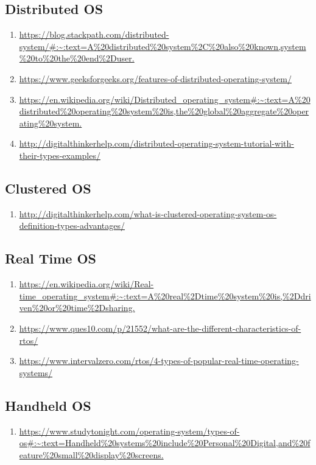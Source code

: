 \documentclass{article}
\begin{document}
\subsection{Distributed OS}
\begin{enumerate}
    \item \url{https://blog.stackpath.com/distributed-system/#:~:text=A%20distributed%20system%2C%20also%20known,system%20to%20the%20end%2Duser.}
    \item \url{https://www.geeksforgeeks.org/features-of-distributed-operating-system/}
    \item \url{https://en.wikipedia.org/wiki/Distributed_operating_system#:~:text=A%20distributed%20operating%20system%20is,the%20global%20aggregate%20operating%20system.}
    \item \url{http://digitalthinkerhelp.com/distributed-operating-system-tutorial-with-their-types-examples/}
\end{enumerate}
\subsection{Clustered OS}
\begin{enumerate}
    \item \url{ http://digitalthinkerhelp.com/what-is-clustered-operating-system-os-definition-types-advantages/}
\end{enumerate}
\subsection{Real Time OS}
\begin{enumerate}
    \item \url{https://en.wikipedia.org/wiki/Real-time_operating_system#:~:text=A%20real%2Dtime%20system%20is,%2Ddriven%20or%20time%2Dsharing.}
    \item \url{ https://www.ques10.com/p/21552/what-are-the-different-characteristics-of-rtos/}
    \item \url{ https://www.intervalzero.com/rtos/4-types-of-popular-real-time-operating-systems/}
\end{enumerate}
\subsection{Handheld OS}
\begin{enumerate}
    \item \url{https://www.studytonight.com/operating-system/types-of-os#:~:text=Handheld%20systems%20include%20Personal%20Digital,and%20feature%20small%20display%20screens.}
\end{enumerate}
\end{document}
